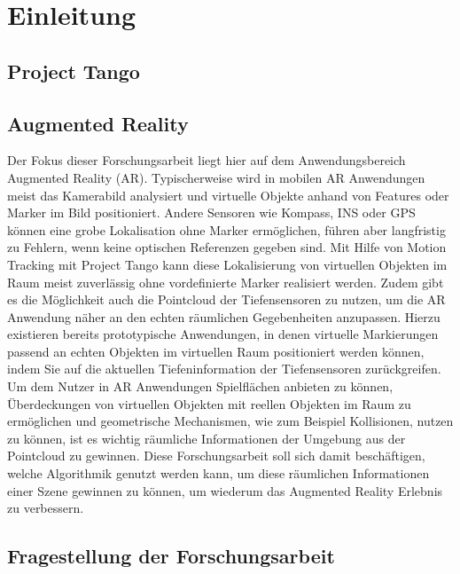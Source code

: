 \chapter{Einleitung}

\section{Project Tango}  \label{sec:project_tango}



\section{Augmented Reality}

Der Fokus dieser Forschungsarbeit liegt hier auf dem Anwendungsbereich Augmented Reality (AR). Typischerweise wird in mobilen AR Anwendungen meist das Kamerabild analysiert und virtuelle Objekte anhand von Features oder Marker im Bild positioniert. Andere Sensoren wie Kompass, INS oder GPS können eine grobe Lokalisation ohne Marker ermöglichen, führen aber langfristig zu Fehlern, wenn keine optischen Referenzen gegeben sind. Mit Hilfe von Motion Tracking mit Project Tango kann diese Lokalisierung von virtuellen Objekten im Raum meist zuverlässig ohne vordefinierte Marker realisiert werden. Zudem gibt es die Möglichkeit auch die Pointcloud der Tiefensensoren zu nutzen, um die AR Anwendung näher an den echten räumlichen Gegebenheiten anzupassen. Hierzu existieren bereits prototypische Anwendungen, in denen virtuelle Markierungen passend an echten Objekten im virtuellen Raum positioniert werden können, indem Sie auf die aktuellen Tiefeninformation der Tiefensensoren zurückgreifen.\\

Um dem Nutzer in AR Anwendungen Spielflächen anbieten zu können, Überdeckungen von virtuellen Objekten mit reellen Objekten im Raum zu ermöglichen und geometrische Mechanismen, wie zum Beispiel Kollisionen, nutzen zu können, ist es wichtig räumliche Informationen der Umgebung aus der Pointcloud zu gewinnen. Diese Forschungsarbeit soll sich damit beschäftigen, welche Algorithmik genutzt werden kann, um diese räumlichen Informationen einer Szene gewinnen zu können, um wiederum das Augmented Reality Erlebnis zu verbessern.\\

\section{Fragestellung der Forschungsarbeit}

